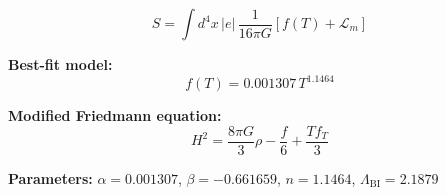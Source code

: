 
\begin{equation}
  S = \int d^4x \, |e| \, \frac{1}{16\pi G} \left[ f(T) + \mathcal{L}_m \right]
\end{equation}

\textbf{Best-fit model:}
\begin{equation}
  f(T) = 0.001307 \, T^{1.1464}
\end{equation}

\textbf{Modified Friedmann equation:}
\begin{equation}
  H^2 = \frac{8\pi G}{3} \rho - \frac{f}{6} + \frac{T f_T}{3}
\end{equation}

\textbf{Parameters:}
$\alpha = 0.001307$, \quad
$\beta = -0.661659$, \quad
$n = 1.1464$, \quad
$\Lambda_{\text{BI}} = 2.1879$